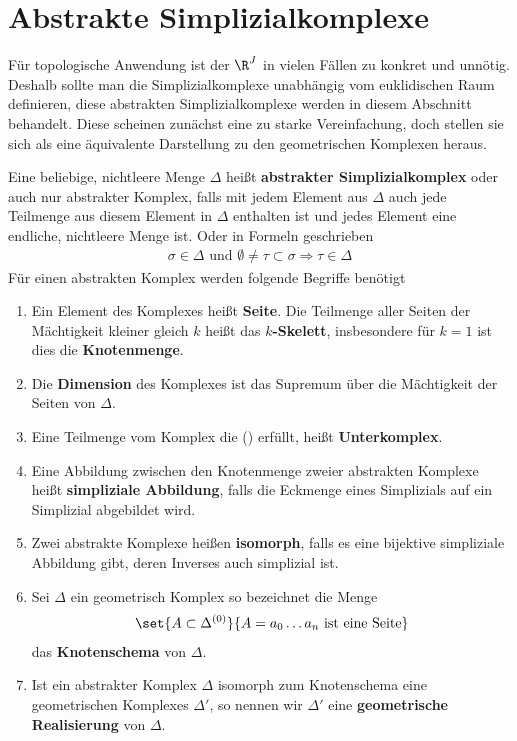 
\section{Abstrakte Simplizialkomplexe}

Für topologische Anwendung ist der $\R^J$ in vielen Fällen zu konkret
und unnötig. Deshalb sollte man die Simplizialkomplexe unabhängig vom
euklidischen Raum definieren, diese abstrakten Simplizialkomplexe
werden in diesem Abschnitt behandelt. Diese scheinen zunächst eine zu
starke Vereinfachung, doch stellen sie sich als eine äquivalente
Darstellung zu den geometrischen Komplexen heraus.

\begin{Def}
  Eine beliebige, nichtleere Menge $\Delta$ heißt \textbf{abstrakter
    Simplizialkomplex} oder auch nur abstrakter Komplex, falls mit
  jedem Element aus $\Delta$ auch jede Teilmenge aus diesem Element in
  $\Delta$ enthalten ist und jedes Element eine endliche, nichtleere
  Menge ist. Oder in Formeln geschrieben
\renewcommand*{\theequation}{\textbullet}
  \begin{gather}
    \sigma \in \Delta \text{ und } \emptyset \neq \tau \subset \sigma
    \Rightarrow \tau \in \Delta
  \end{gather}
  Für einen abstrakten Komplex werden folgende Begriffe benötigt
  \begin{enumerate}[({A}1)]
  \item Ein Element des Komplexes heißt \textbf{Seite}. Die Teilmenge aller
    Seiten der Mächtigkeit kleiner gleich $k$ heißt das \textbf{$k$-Skelett},
    insbesondere für $k=1$ ist dies die \textbf{Knotenmenge}.
  \item Die \textbf{Dimension} des Komplexes ist das Supremum über die
    Mächtigkeit der Seiten von $\Delta$.
  \item Eine Teilmenge vom Komplex die (\textbullet) erfüllt, heißt
    \textbf{Unterkomplex}.
  \item Eine Abbildung zwischen den Knotenmenge zweier abstrakten
    Komplexe heißt \textbf{simpliziale Abbildung}, falls die Eckmenge eines
    Simplizials auf ein Simplizial abgebildet wird.
  \item Zwei abstrakte Komplexe heißen \textbf{isomorph}, falls es eine
    bijektive simpliziale Abbildung gibt, deren Inverses auch
    simplizial ist.
  \item Sei $\Delta$ ein geometrisch Komplex so bezeichnet die Menge
    \begin{gather*}
      \set{ A \subset \Delta^{(0) }}{ A = a_0 \ldots a_n \text{ ist
          eine Seite}}
    \end{gather*}
    das \textbf{Knotenschema} von $\Delta$.
  \item Ist ein abstrakter Komplex $\Delta$ isomorph zum Knotenschema
    eine geometrischen Komplexes $\Delta'$, so nennen wir $\Delta'$
    eine \textbf{geometrische Realisierung} von $\Delta$.
  \end{enumerate}
\end{Def}

